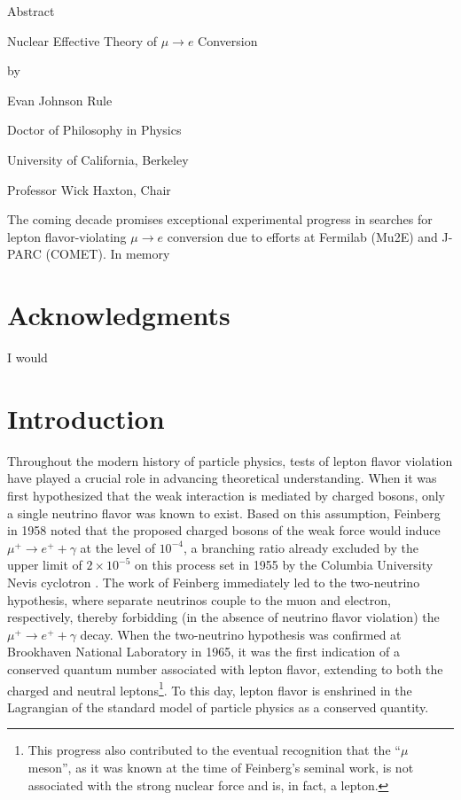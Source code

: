 \documentclass{book}[letterpaper,12pt]
\renewcommand{\headrulewidth}{0pt}
\begin{document}
\newpage
{}
\begin{center}
Abstract

\vspace{1cm}
Nuclear Effective Theory of $\mu\rightarrow e$ Conversion

\vspace{0.5cm}
by

\vspace{0.5cm}
Evan Johnson Rule

\vspace{0.5cm}
Doctor of Philosophy in Physics

\vspace{0.5cm}
University of California, Berkeley

\vspace{0.5cm}
Professor Wick Haxton, Chair
\end{center}
The coming decade promises exceptional experimental progress in searches for lepton flavor-violating $\mu\rightarrow e$ conversion due to efforts at Fermilab (Mu2E) and J-PARC (COMET). 
\frontmatter
\vspace*{10cm}
In memory
\tableofcontents
\listoffigures
\listoftables
\chapter*{\centering Acknowledgments}
I would
\mainmatter
\fancyhead[L]{\leftmark}
\chapter{Introduction}
\thispagestyle{headings}
Throughout the modern history of particle physics, tests of lepton flavor violation have played a crucial role in advancing theoretical understanding. When it was first hypothesized that the weak interaction is mediated by charged bosons, only a single neutrino flavor was known to exist. Based on this assumption, Feinberg \cite{PhysRev.110.1482} in 1958 noted that the proposed charged bosons of the weak force would induce $\mu^+\rightarrow e^+ + \gamma$ at the level of $10^{-4}$, a branching ratio already excluded by the upper limit of $2\times 10^{-5}$ on this process set in 1955 by the Columbia University Nevis cyclotron \cite{PhysRev.98.240}. The work of Feinberg immediately led to the two-neutrino hypothesis, where separate neutrinos couple to the muon and electron, respectively, thereby forbidding (in the absence of neutrino flavor violation) the $\mu^+\rightarrow e^+ + \gamma$ decay. When the two-neutrino hypothesis was confirmed at Brookhaven National Laboratory \cite{PhysRevLett.9.36} in 1965, it was the first indication of a conserved quantum number associated with lepton flavor, extending to both the charged and neutral leptons\footnote{This progress also contributed to the eventual recognition that the ``$\mu$ meson'', as it was known at the time of Feinberg's seminal work, is not associated with the strong nuclear force and is, in fact, a lepton.}. To this day, lepton flavor is enshrined in the Lagrangian of the standard model of particle physics as a conserved quantity. 
\end{document}
